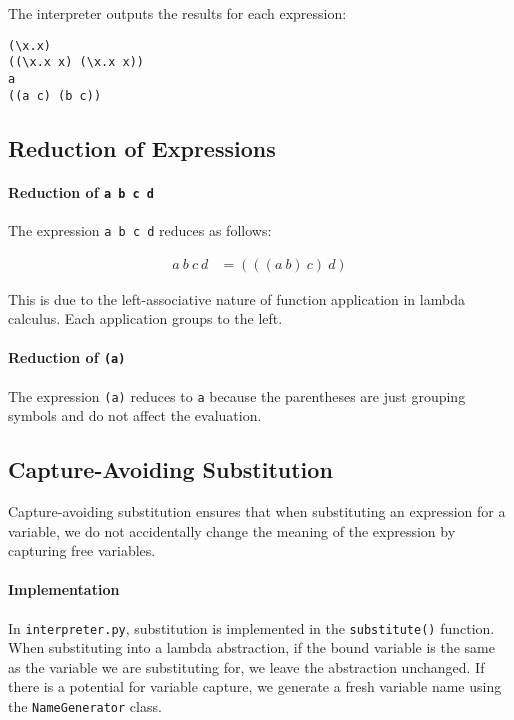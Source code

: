 The interpreter outputs the results for each expression:

\begin{verbatim}
(\x.x)
((\x.x x) (\x.x x))
a
((a c) (b c))
\end{verbatim}

\subsection{Reduction of Expressions}

\paragraph{Reduction of \texttt{a b c d}}

The expression \texttt{a b c d} reduces as follows:

\begin{align*}
a\ b\ c\ d &= (((a\ b)\ c)\ d)
\end{align*}

This is due to the left-associative nature of function application in lambda calculus. Each application groups to the left.

\paragraph{Reduction of \texttt{(a)}}

The expression \texttt{(a)} reduces to \texttt{a} because the parentheses are just grouping symbols and do not affect the evaluation.

\subsection{Capture-Avoiding Substitution}

Capture-avoiding substitution ensures that when substituting an expression for a variable, we do not accidentally change the meaning of the expression by capturing free variables.

\paragraph{Implementation}

In \texttt{interpreter.py}, substitution is implemented in the \texttt{substitute()} function. When substituting into a lambda abstraction, if the bound variable is the same as the variable we are substituting for, we leave the abstraction unchanged. If there is a potential for variable capture, we generate a fresh variable name using the \texttt{NameGenerator} class.

